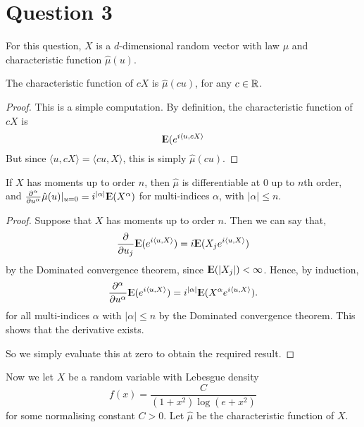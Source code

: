 \documentclass{unswmaths}
\begin{document}
\section*{Question 3}
For this question, $X$ is a $d$-dimensional random vector with law
$\mu$ and characteristic function $\hat{\mu}(u)$.
\begin{lemma}
    The characteristic function of $cX$ is $\hat{\mu}(cu)$,
    for any $c \in \mathbb{R}$.
\end{lemma} 
\begin{proof}
    This is a simple computation. By definition, the characteristic
    function of $cX$ is
    \begin{equation*}
        {\rm I\kern-.3em E}(e^{i\langle u,cX\rangle}
    \end{equation*}
    But since $\langle u,cX\rangle = \langle cu,X\rangle$, this is simply
    $\hat{\mu}(cu)$.
\end{proof}

\begin{theorem}
    If $X$ has moments up to order $n$, then $\hat{\mu}$ is differentiable
    at $0$ up to $n$th order, and $\frac{\partial^\alpha}{\partial u^\alpha}\hat{\mu}(u)|_{u=0} = i^{|\alpha|}{\rm I\kern-.3em E}(X^\alpha)$ for multi-indices $\alpha$, with
    $|\alpha| \leq n$.
\end{theorem}
\begin{proof}
    
    Suppose that $X$ has moments up to order $n$. Then we can say that,
    \begin{equation*}
        \frac{\partial}{\partial u_j} {\rm I\kern-.3em E}(e^{i\langle u,X\rangle}) = i{\rm I\kern-.3em E}(X_je^{i\langle u,X\rangle})
    \end{equation*}
    by the Dominated convergence theorem, since ${\rm I\kern-.3em E}(|X_j|) < \infty$. Hence,
    by induction,
    \begin{equation*}
        \frac{\partial^\alpha}{\partial u^\alpha}{\rm I\kern-.3em E}(e^{i\langle u,X\rangle}) = i^{|\alpha|} {\rm I\kern-.3em E}(X^\alpha e^{i\langle u,X\rangle}).
    \end{equation*}
    for all multi-indices $\alpha$ with $|\alpha| \leq n$ by the Dominated
    convergence theorem. This shows that the derivative exists.
    
    So we simply evaluate this at zero to obtain the required result.
\end{proof}    
Now we let $X$ be a random variable with Lebesgue density
\begin{equation*}
    f(x) = \frac{C}{(1+x^2)\log(e+x^2)}
\end{equation*}
for some normalising constant $C > 0$. Let $\hat{\mu}$ be the
characteristic function of $X$.
\end{document}
